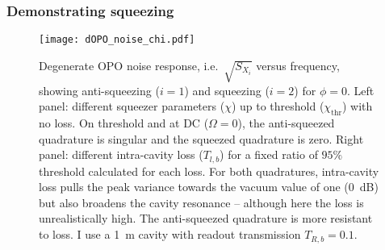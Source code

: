 
\subsubsection{Demonstrating squeezing}

\begin{figure}
	\centering
	\texttt{[image: dOPO\_noise\_chi.pdf]}
	\caption{Degenerate OPO noise response, i.e.\ $\sqrt{S_{X_i}}$ versus frequency, showing anti-squeezing ($i=1$) and squeezing ($i=2$) for $\phi=0$. Left panel: different squeezer parameters ($\chi$) up to threshold ($\chi_\text{thr}$) with no loss. On threshold and at DC ($\Omega=0$), the anti-squeezed quadrature is singular and the squeezed quadrature is zero. Right panel: different intra-cavity loss ($T_{l,b}$) for a fixed ratio of $95\%$ threshold calculated for each loss. For both quadratures, intra-cavity loss pulls the peak variance towards the vacuum value of one (0~dB) but also broadens the cavity resonance -- although here the loss is unrealistically high. The anti-squeezed quadrature is more resistant to loss. I use a 1~m cavity with readout transmission $T_{R,b}=0.1$.}
	\label{fig:dOPO_variances}
\end{figure}

